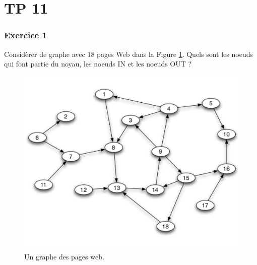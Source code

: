 \chapter*{TP 11}









\subsection*{Exercice 1}
Considèrer de graphe avec 18 pages Web dans la Figure \ref{fig:webg}. Quels sont les noeuds qui font partie du noyau, les noeuds IN et les noeuds
OUT ? 

    \begin{figure}[h!]
    \begin{center}
    \includegraphics[scale = 0.3]{figs/graph.png}
    \end{center}
    \caption{Un graphe des pages web.}
    \label{fig:webg}
    \end{figure}

